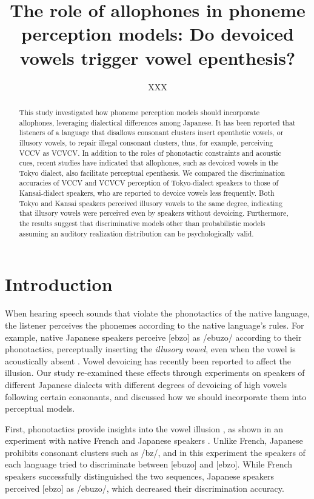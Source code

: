 \documentclass[a4paper,11pt,twocolumn]{article}
\title{The role of allophones in phoneme perception models: Do devoiced vowels trigger vowel epenthesis?}
\author{XXX}
\begin{document}
\maketitle

\begin{abstract}
This study investigated how phoneme perception models should incorporate allophones, leveraging dialectical differences among Japanese. It has been reported that listeners of a language that disallows consonant clusters insert epenthetic vowels, or illusory vowels, to repair illegal consonant clusters, thus, for example, perceiving VCCV as VCVCV. In addition to the roles of phonotactic constraints and acoustic cues, recent studies have indicated that allophones, such as devoiced vowels in the Tokyo dialect, also facilitate perceptual epenthesis. We compared the discrimination accuracies of VCCV and VCVCV perception of Tokyo-dialect speakers to those of Kansai-dialect speakers, who are reported to devoice vowels less frequently. Both Tokyo and Kansai speakers perceived illusory vowels to the same degree, indicating that illusory vowels were perceived even by speakers without devoicing. Furthermore, the results suggest that discriminative models other than probabilistic models assuming an auditory realization distribution can be psychologically valid.
\end{abstract}


\section{Introduction}

When hearing speech sounds that violate the phonotactics of the native language, the listener perceives the phonemes according to the native language's rules. For example, native Japanese speakers perceive [ebzo] as /ebuzo/ according to their phonotactics, perceptually inserting the \textit{illusory vowel}, even when the vowel is acoustically absent \cite{dupoux1999epentheticvi, dupoux2011illusory}. Vowel devoicing has recently been reported to affect the illusion\cite{kilpatrick2018japanese}. Our study re-examined these effects through experiments on speakers of different Japanese dialects with different degrees of devoicing of high vowels following certain consonants, and discussed how we should incorporate them into perceptual models.

First, phonotactics provide insights into the vowel illusion \cite{halle2014special, monahan2009not, mattingley2015influence}, as shown in an experiment with native French and Japanese speakers \cite{dupoux1999epentheticvi}. Unlike French, Japanese prohibits consonant clusters such as /bz/, and in this experiment the speakers of each language tried to discriminate between [ebuzo] and [ebzo]. While French speakers successfully distinguished the two sequences, Japanese speakers perceived [ebzo] as /ebuzo/, which decreased their discrimination accuracy.
\end{document}
